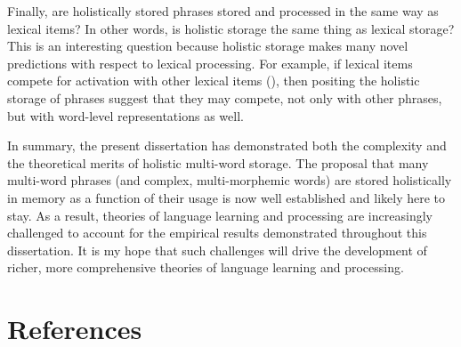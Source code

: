 \documentclass[
  12pt,
  letterpaper,
]{scrreport}
\begin{document}
Finally, are holistically stored phrases stored and processed in the
same way as lexical items? In other words, is holistic storage the same
thing as lexical storage? This is an interesting question because
holistic storage makes many novel predictions with respect to lexical
processing. For example, if lexical items compete for activation with
other lexical items (), then positing the holistic storage of phrases suggest that they
may compete, not only with other phrases, but with word-level
representations as well.

In summary, the present dissertation has demonstrated both the
complexity and the theoretical merits of holistic multi-word storage.
The proposal that many multi-word phrases (and complex, multi-morphemic
words) are stored holistically in memory as a function of their usage is
now well established and likely here to stay. As a result, theories of
language learning and processing are increasingly challenged to account
for the empirical results demonstrated throughout this dissertation. It
is my hope that such challenges will drive the development of richer,
more comprehensive theories of language learning and processing.


\chapter*{References}\label{references}


\begingroup
\raggedright
\end{document}
